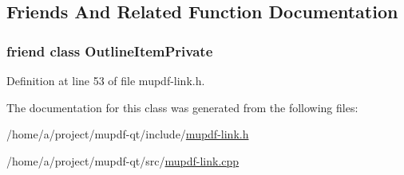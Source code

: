 \subsection{Friends And Related Function Documentation}
\hypertarget{class_mu_p_d_f_1_1_link_goto_ab008ed670017e41b6e6bba8707c775d2}{
\subsubsection[{Outline\-Item\-Private}]{\setlength{\rightskip}{0pt plus 5cm}friend class Outline\-Item\-Private\hspace{0.3cm}{\ttfamily [friend]}}}\label{class_mu_p_d_f_1_1_link_goto_ab008ed670017e41b6e6bba8707c775d2}


Definition at line 53 of file mupdf-\/link.\-h.



The documentation for this class was generated from the following files\-:\begin{DoxyCompactItemize}
\item 
/home/a/project/mupdf-\/qt/include/\hyperlink{mupdf-link_8h}{mupdf-\/link.\-h}\item 
/home/a/project/mupdf-\/qt/src/\hyperlink{mupdf-link_8cpp}{mupdf-\/link.\-cpp}\end{DoxyCompactItemize}
